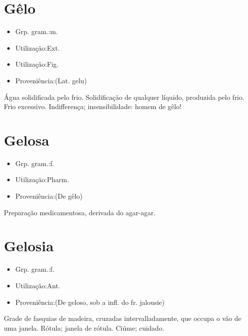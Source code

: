 \section{Gêlo}
\begin{itemize}
\item {Grp. gram.:m.}
\end{itemize}
\begin{itemize}
\item {Utilização:Ext.}
\end{itemize}
\begin{itemize}
\item {Utilização:Fig.}
\end{itemize}
\begin{itemize}
\item {Proveniência:(Lat. \textunderscore gelu\textunderscore )}
\end{itemize}
Água solidificada pelo frio.
Solidificação de qualquer líquido, produzida pelo frio.
Frio excessivo.
Indifferença; insensibilidade: \textunderscore homem de gêlo\textunderscore !
\section{Gelosa}
\begin{itemize}
\item {Grp. gram.:f.}
\end{itemize}
\begin{itemize}
\item {Utilização:Pharm.}
\end{itemize}
\begin{itemize}
\item {Proveniência:(De \textunderscore gêlo\textunderscore )}
\end{itemize}
Preparação medicamentosa, derivada do agar-agar.
\section{Gelosia}
\begin{itemize}
\item {Grp. gram.:f.}
\end{itemize}
\begin{itemize}
\item {Utilização:Ant.}
\end{itemize}
\begin{itemize}
\item {Proveniência:(De \textunderscore geloso\textunderscore , sob a infl. do fr. \textunderscore jalousie\textunderscore )}
\end{itemize}
Grade de fasquias de madeira, cruzadas intervalladamente, que occupa o vão de uma janela.
Rótula; janela de rótula.
Ciúme; cuidado.

